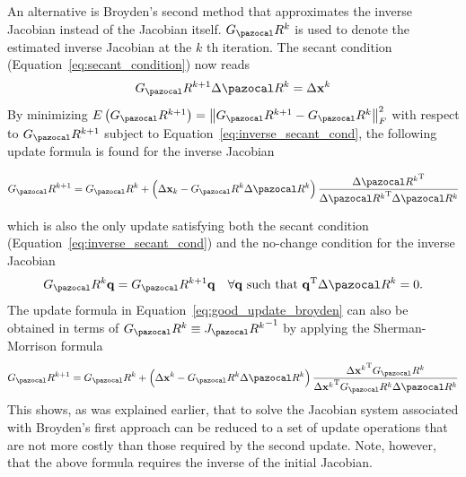 An alternative is Broyden's second method that approximates the inverse Jacobian instead of the Jacobian itself.
\(G_\pazocal R^{k}\) is used to denote the estimated inverse Jacobian at the \(k\) th iteration.
The secant condition (Equation~\eqref{eq:secant_condition}) now reads
\begin{equation} \label{eq:inverse_secant_cond}
G_\pazocal R^{k+1} \Delta \pazocal R^{k}=\Delta \mathbf x^{k}
\end{equation}
By minimizing \(E\left(G_\pazocal R^{k+1}\right)=\left\|G_\pazocal R^{k+1}-G_\pazocal R^{k}\right\|_{F}^{2}\) with respect to \(G_\pazocal R^{k+1}\) subject to Equation~\eqref{eq:inverse_secant_cond}, the following update formula is found for the inverse Jacobian
\begin{highlight}
  \begin{equation} \label{eq:bad_update_broyden}
  G_\pazocal R^{k+1}=G_\pazocal R^{k}+\left(\Delta \mathbf x_{k}-G_\pazocal R^{k} \Delta \pazocal R^{k}\right) \frac{\Delta {\pazocal R^{k}}^{\mathrm{T}}}{\Delta {\pazocal R^{k}}^{\mathrm{T}} \Delta \pazocal R^{k}}
  \end{equation}
\end{highlight}
which is also the only update satisfying both the secant condition (Equation~\eqref{eq:inverse_secant_cond}) and the no-change condition for the inverse Jacobian
\begin{equation}
  G_\pazocal R^{k} \mathbf q=G_\pazocal R^{k+1} \mathbf q \quad \forall \mathbf q \text { such that } \mathbf q^{\mathrm{T}} \Delta \pazocal R^{k}=0.
\end{equation}
The update formula in Equation~\eqref{eq:good_update_broyden} can also be obtained in terms of \(G_\pazocal R^{k} \equiv {J_\pazocal R^{k}}^{-1}\) by applying the Sherman-Morrison formula
\begin{equation}
G_\pazocal R^{k+1}=G_\pazocal R^{k}+\left(\Delta \mathbf x^{k}-G_\pazocal R^{k} \Delta \pazocal R^{k}\right) \frac{\Delta {\mathbf x^{k}}^{\mathrm{T}} G_\pazocal R^{k}}{\Delta {\mathbf x^{k}}^{\mathrm{T}} G_\pazocal R^{k} \Delta \pazocal R^{k}}
\end{equation}
This shows, as was explained earlier, that to solve the Jacobian system associated with Broyden's first approach can be reduced to a set of update operations that are not more costly than those required by the second update.
Note, however, that the above formula requires the inverse of the initial Jacobian.

